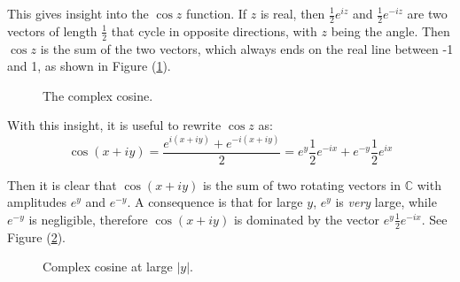 \documentclass[12pt, a4paper, twoside, openright]{book}
\begin{document}
This gives insight into the $\cos z$ function.  If $z$ is real, then $\frac{1}{2} e^{iz}$ and $\frac{1}{2} e^{-iz}$ are two vectors of length $\frac{1}{2}$ that cycle in opposite directions, with $z$ being the angle. Then $\cos z$ is the sum of the two vectors, which always ends on the real line between -1 and 1, as shown in Figure (\ref{fig:cos}). 

\begin{figure}[h]
\centering
{}
\caption{The complex cosine.} \label{fig:cos}
\end{figure}

With this insight, it is useful to rewrite $\cos z$ as:
\begin{equation}
\cos (x + iy) = \frac{ e^{i(x+iy)}+e^{-i(x+iy)} }{2} =
e^{y} \frac{1}{2}e^{-ix} + e^{-y} \frac{1}{2} e^{ix}
\end{equation}

Then it is clear that $\cos (x + iy)$ is the sum of two rotating vectors in $\mathbb{C}$ with amplitudes $e^y$ and $e^{-y}$.  A consequence is that for large $y$, $e^y$ is \emph{very} large, while $e^{-y}$ is negligible, therefore $\cos (x + iy)$ is dominated by the vector $ e^{y} \frac{1}{2}e^{-ix} $.  See Figure (\ref{fig:coslargey}).

\begin{figure}[ht]
\centering
{}
\caption{Complex cosine at large $|y|$.} \label{fig:coslargey}
\end{figure}
\end{document}
